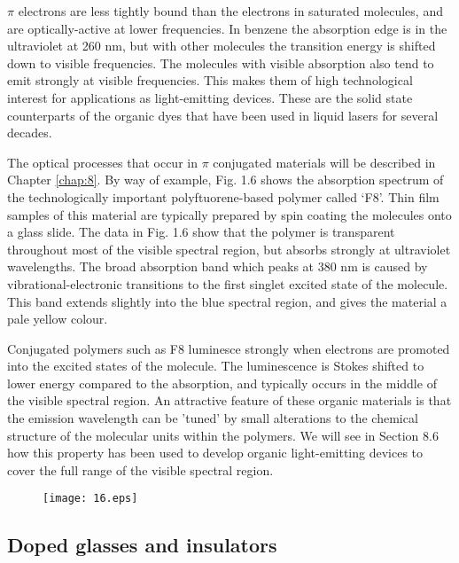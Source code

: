 \documentclass[12pt]{book}
\begin{document}
$\pi$ electrons are less tightly bound than the electrons in saturated molecules, and are optically-active at lower frequencies. In benzene the absorption edge is in the ultraviolet at 260 nm, but with other molecules the transition energy is shifted down to visible frequencies. The molecules with visible absorption also tend to emit strongly at visible frequencies. This makes them of high technological interest for applications as light-emitting devices. These are the solid state counterparts of the organic dyes that have been used in liquid lasers for several decades.

The optical processes that occur in $\pi$ conjugated materials will be described in Chapter \ref{chap:8}. By way of example, Fig. 1.6 shows the absorption spectrum of the technologically important polyftuorene-based polymer called `F8'. Thin film samples of this material are typically prepared by spin coating the molecules onto a glass slide. The data in Fig. 1.6 show that the polymer is transparent throughout most of the visible spectral region, but absorbs strongly at ultraviolet wavelengths. The broad absorption band which peaks at 380 nm is caused by vibrational-electronic transitions to the first singlet excited state of the molecule. This band extends slightly into the blue spectral region, and gives the material a pale yellow colour.

Conjugated polymers such as F8 luminesce strongly when electrons are promoted into the excited states of the molecule. The luminescence is Stokes shifted to lower energy compared to the absorption, and typically occurs in the middle of the visible spectral region. An attractive feature of these organic materials is that the emission wavelength can be 'tuned' by small alterations to the chemical structure of the molecular units within the polymers. We will see in Section 8.6 how this property has been used to develop organic light-emitting devices to cover the full range of the visible spectral region.

\begin{figure}[htbp]
  \centering
  \texttt{[image: 16.eps]}\\ \label{fig:1.6}
\end{figure}

\subsection{Doped glasses and insulators}
\end{document}
